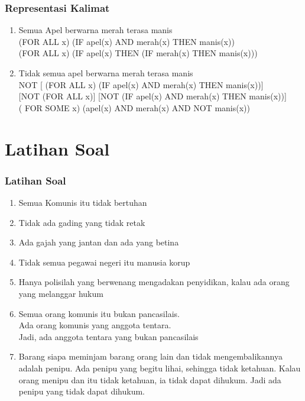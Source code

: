\documentclass[handout]{beamer}
\theoremstyle{definition}
\theoremstyle{example}
\begin{document}
\begin{frame}
	\frametitle{Representasi Kalimat}
	 \begin{enumerate}       
        \item {\color{red}Semua} Apel berwarna merah terasa manis\\
        ({\color{red}FOR ALL x}) (IF apel(x) AND merah(x) THEN manis(x))\\
        ({\color{red}FOR ALL x}) (IF apel(x) THEN (IF merah(x) THEN manis(x)))
        \item {\color{red}Tidak semua} apel berwarna merah terasa manis\\
        NOT {[} ({\color{red}FOR ALL x}) (IF apel(x) AND merah(x) THEN manis(x)){]} \\
        {[}NOT ({\color{red}FOR ALL x}){]} {[}NOT (IF apel(x) AND merah(x) THEN manis(x)){]}\\
        ({\color{red} FOR SOME x}) (apel(x) AND merah(x) AND NOT manis(x))
    \end{enumerate}      
\end{frame}

\section{Latihan Soal}
\begin{frame}
    \frametitle{Latihan Soal}
    \begin{enumerate}       
    	\item {\color{red} Semua} Komunis itu tidak bertuhan
    	\item Tidak {\color{red}ada} gading yang tidak retak
    	\item {\color{red}Ada} gajah yang jantan dan {\color{red}ada} yang betina
    	\item {\color{red}Tidak semua} pegawai negeri itu manusia korup
    	\item {\color{red}Hanya polisilah} yang berwenang mengadakan penyidikan, kalau {\color{red}ada} orang yang melanggar hukum
    	\item {\color{red}Semua} orang komunis itu bukan pancasilais.\\
              {\color{red}Ada} orang komunis yang anggota tentara.\\
              Jadi, {\color{red}ada} anggota tentara yang bukan pancasilais
    	\item {\color{red}Barang siapa} meminjam barang orang lain dan tidak mengembalikannya adalah penipu. {\color{red}Ada} penipu yang begitu lihai, sehingga tidak ketahuan.
        Kalau {\color{red}orang} menipu dan itu tidak ketahuan, ia tidak dapat dihukum.
        Jadi {\color{red}ada} penipu yang tidak dapat dihukum. 
   \end{enumerate}     	
\end{frame}
\end{document}

